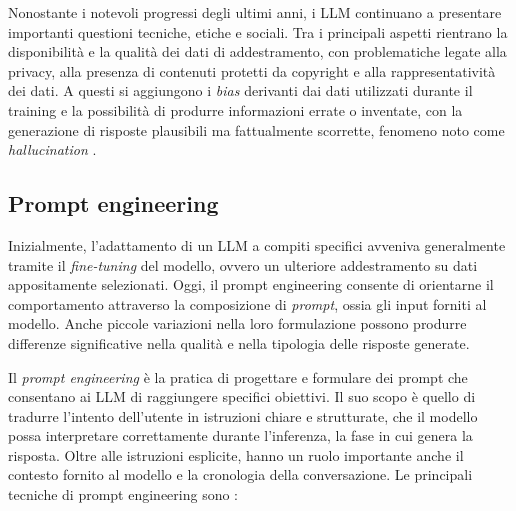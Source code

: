Nonostante i notevoli progressi degli ultimi anni, i LLM continuano a presentare importanti questioni tecniche, etiche e sociali. Tra i principali aspetti rientrano la disponibilità e la qualità dei dati di addestramento, con problematiche legate alla privacy, alla presenza di contenuti protetti da copyright e alla rappresentatività dei dati. A questi si aggiungono i \emph{bias} derivanti dai dati utilizzati durante il training e la possibilità di produrre informazioni errate o inventate, con la generazione di risposte plausibili ma fattualmente scorrette, fenomeno noto come \emph{hallucination} \cite{dhamani2026genai}. %


\subsection{Prompt engineering} %

Inizialmente, l'adattamento di un LLM a compiti specifici avveniva generalmente tramite il \emph{fine-tuning} del modello, ovvero un ulteriore addestramento su dati appositamente selezionati. Oggi, il prompt engineering consente di orientarne il comportamento attraverso la composizione di \emph{prompt}, ossia gli input forniti al modello. Anche piccole variazioni nella loro formulazione possono produrre differenze significative nella qualità e nella tipologia delle risposte generate.


Il \emph{prompt engineering} \cite{dhamani2026genai} è la pratica di progettare e formulare dei prompt che consentano ai LLM di raggiungere specifici obiettivi. Il suo scopo è quello di tradurre l'intento dell'utente in istruzioni chiare e strutturate, che il modello possa interpretare correttamente durante l'inferenza, la fase in cui genera la risposta. Oltre alle istruzioni esplicite, hanno un ruolo importante anche il contesto fornito al modello e la cronologia della conversazione. Le principali tecniche di prompt engineering sono \cite{dhamani2026genai}: %

